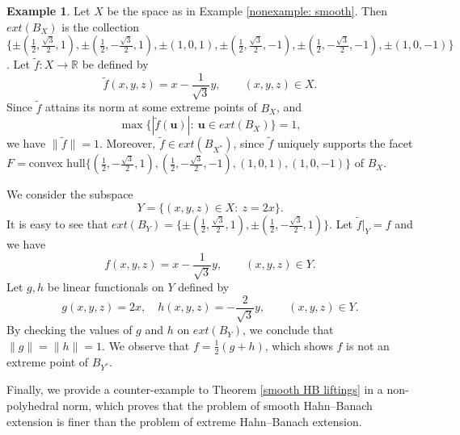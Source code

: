 \documentclass{amsart}
\theoremstyle{definition}
\newtheorem{example}[theorem]{Example}
\theoremstyle{remark}
\numberwithin{equation}{section}
\begin{document}
\begin{example}\label{norm pres. restr.}
Let $X$ be the space as in Example \ref{nonexample: smooth}. Then $ext(B_X)$ is the collection $\{\pm(\frac{1}{2}, \frac{\sqrt{3}}{2},1), \pm(\frac{1}{2}, -\frac{\sqrt{3}}{2},1), \pm (1,0,1), \pm(\frac{1}{2}, \frac{\sqrt{3}}{2},-1), \pm(\frac{1}{2}, -\frac{\sqrt{3}}{2},-1), \pm (1,0,-1)\}$.  Let $\widetilde{f}:X\to \mathbb{R}$ be defined by
\[
\widetilde{f}(x,y,z)=x-\frac{1}{\sqrt{3}}y, \qquad (x,y,z)\in X.
\]
Since $\widetilde{f}$ attains its norm at some extreme points of $B_X$, and
\[
\max \{|\widetilde{f}(\mathbf{u})|:~\mathbf{u}\in ext(B_X)\}=1,
\]
we have $\|\widetilde{f}\|=1$. Moreover, $\widetilde{f}\in ext(B_{X^*})$, since $\widetilde{f}$ uniquely supports the facet $F=\text{convex hull}\{(\frac{1}{2}, -\frac{\sqrt{3}}{2},1), (\frac{1}{2}, -\frac{\sqrt{3}}{2},-1), (1,0,1),(1,0,-1)\}$ of $B_X$.


\medskip



\noindent We consider the subspace
\[
Y=\{(x,y,z)\in X:~z=2x\}.
\]
It is easy to see that $ext(B_Y)=\{\pm(\frac{1}{2}, \frac{\sqrt{3}}{2},1), \pm(\frac{1}{2}, -\frac{\sqrt{3}}{2},1)\}$.
Let $\widetilde{f}|_Y=f$ and we have
\[
f(x,y,z)= x-\frac{1}{\sqrt{3}}y, \qquad (x,y,z)\in Y.
\]
Let $g,h$ be linear functionals on $Y$ defined by
\[
g(x,y,z)=2x, \quad h(x,y,z)= -\frac{2}{\sqrt{3}}y, \qquad (x,y,z)\in Y.
\]
By checking the values of $g$ and $h$ on $ext(B_Y)$, we conclude that $\|g\|=\|h\|=1$. We observe that $f=\frac{1}{2}(g+h)$, which shows $f$ is not an extreme point of $B_{Y^*}$.
\end{example}

\noindent Finally, we provide a counter-example to Theorem \ref{smooth HB liftings} in a non-polyhedral norm, which proves that the problem of smooth Hahn--Banach extension is finer than the problem of extreme Hahn--Banach extension.
\end{document}
